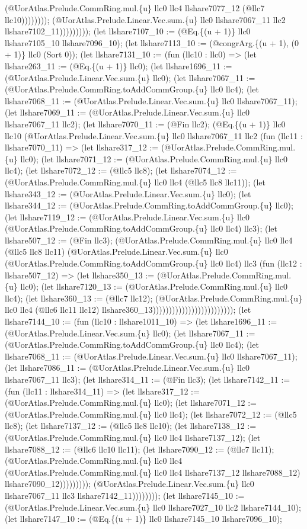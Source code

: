 \documentclass[11pt]{article}
\begin{document}
(@UorAtlas.Prelude.CommRing.mul.\{u\} llc0 llc4 llshare7077\_12 (@llc7 llc10)))))))); (@UorAtlas.Prelude.Linear.Vec.sum.\{u\} llc0 llshare7067\_11 llc2 llshare7102\_11))))))))); (let llshare7107\_10 := (@Eq.\{(u + 1)\} llc0 llshare7105\_10 llshare7096\_10); (let llshare7113\_10 := (@congrArg.\{(u + 1), (0 + 1)\} llc0 (Sort 0)); (let llshare7131\_10 := (fun (llc10 : llc0) => (let llshare263\_11 := (@Eq.\{(u + 1)\} llc0); (let llshare1696\_11 := (@UorAtlas.Prelude.Linear.Vec.sum.\{u\} llc0); (let llshare7067\_11 := (@UorAtlas.Prelude.CommRing.toAddCommGroup.\{u\} llc0 llc4); (let llshare7068\_11 := (@UorAtlas.Prelude.Linear.Vec.sum.\{u\} llc0 llshare7067\_11); (let llshare7069\_11 := (@UorAtlas.Prelude.Linear.Vec.sum.\{u\} llc0 llshare7067\_11 llc2); (let llshare7070\_11 := (@Fin llc2); (@Eq.\{(u + 1)\} llc0 llc10 (@UorAtlas.Prelude.Linear.Vec.sum.\{u\} llc0 llshare7067\_11 llc2 (fun (llc11 : llshare7070\_11) => (let llshare317\_12 := (@UorAtlas.Prelude.CommRing.mul.\{u\} llc0); (let llshare7071\_12 := (@UorAtlas.Prelude.CommRing.mul.\{u\} llc0 llc4); (let llshare7072\_12 := (@llc5 llc8); (let llshare7074\_12 := (@UorAtlas.Prelude.CommRing.mul.\{u\} llc0 llc4 (@llc5 llc8 llc11)); (let llshare343\_12 := (@UorAtlas.Prelude.Linear.Vec.sum.\{u\} llc0); (let llshare344\_12 := (@UorAtlas.Prelude.CommRing.toAddCommGroup.\{u\} llc0); (let llshare7119\_12 := (@UorAtlas.Prelude.Linear.Vec.sum.\{u\} llc0 (@UorAtlas.Prelude.CommRing.toAddCommGroup.\{u\} llc0 llc4) llc3); (let llshare507\_12 := (@Fin llc3); (@UorAtlas.Prelude.CommRing.mul.\{u\} llc0 llc4 (@llc5 llc8 llc11) (@UorAtlas.Prelude.Linear.Vec.sum.\{u\} llc0 (@UorAtlas.Prelude.CommRing.toAddCommGroup.\{u\} llc0 llc4) llc3 (fun (llc12 : llshare507\_12) => (let llshare350\_13 := (@UorAtlas.Prelude.CommRing.mul.\{u\} llc0); (let llshare7120\_13 := (@UorAtlas.Prelude.CommRing.mul.\{u\} llc0 llc4); (let llshare360\_13 := (@llc7 llc12); (@UorAtlas.Prelude.CommRing.mul.\{u\} llc0 llc4 (@llc6 llc11 llc12) llshare360\_13))))))))))))))))))))))))); (let llshare7144\_10 := (fun (llc10 : llshare1011\_10) => (let llshare1696\_11 := (@UorAtlas.Prelude.Linear.Vec.sum.\{u\} llc0); (let llshare7067\_11 := (@UorAtlas.Prelude.CommRing.toAddCommGroup.\{u\} llc0 llc4); (let llshare7068\_11 := (@UorAtlas.Prelude.Linear.Vec.sum.\{u\} llc0 llshare7067\_11); (let llshare7086\_11 := (@UorAtlas.Prelude.Linear.Vec.sum.\{u\} llc0 llshare7067\_11 llc3); (let llshare314\_11 := (@Fin llc3); (let llshare7142\_11 := (fun (llc11 : llshare314\_11) => (let llshare317\_12 := (@UorAtlas.Prelude.CommRing.mul.\{u\} llc0); (let llshare7071\_12 := (@UorAtlas.Prelude.CommRing.mul.\{u\} llc0 llc4); (let llshare7072\_12 := (@llc5 llc8); (let llshare7137\_12 := (@llc5 llc8 llc10); (let llshare7138\_12 := (@UorAtlas.Prelude.CommRing.mul.\{u\} llc0 llc4 llshare7137\_12); (let llshare7088\_12 := (@llc6 llc10 llc11); (let llshare7090\_12 := (@llc7 llc11); (@UorAtlas.Prelude.CommRing.mul.\{u\} llc0 llc4 (@UorAtlas.Prelude.CommRing.mul.\{u\} llc0 llc4 llshare7137\_12 llshare7088\_12) llshare7090\_12))))))))); (@UorAtlas.Prelude.Linear.Vec.sum.\{u\} llc0 llshare7067\_11 llc3 llshare7142\_11)))))))); (let llshare7145\_10 := (@UorAtlas.Prelude.Linear.Vec.sum.\{u\} llc0 llshare7027\_10 llc2 llshare7144\_10); (let llshare7147\_10 := (@Eq.\{(u + 1)\} llc0 llshare7145\_10 llshare7096\_10); 
\end{document}
